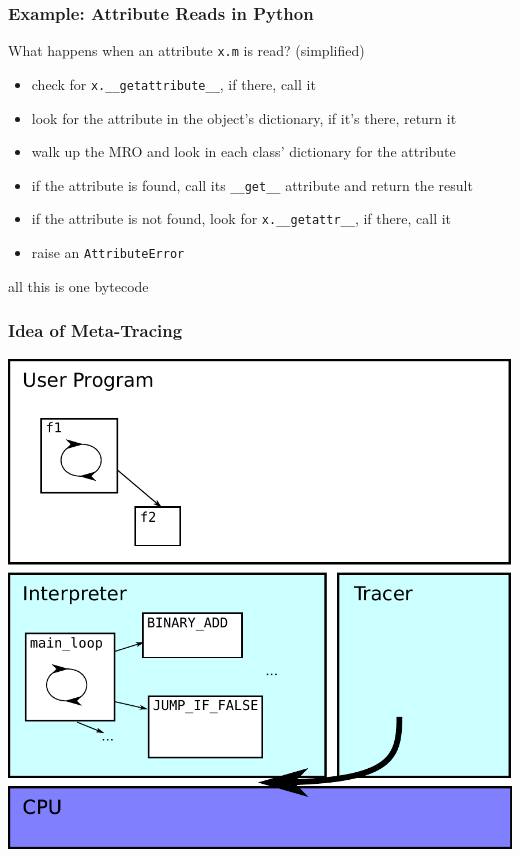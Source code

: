 \documentclass[utf8x]{beamer}
\begin{document}
\begin{frame}
  \frametitle{Example: Attribute Reads in Python}
  What happens when an attribute \texttt{x.m} is read? (simplified)
  \begin{itemize}
      \item check for \texttt{x.\_\_getattribute\_\_}, if there, call it
      \pause
      \item look for the attribute in the object's dictionary, if it's there, return it
      \pause
      \item walk up the MRO and look in each class' dictionary for the attribute
      \pause
      \item if the attribute is found, call its \texttt{\_\_get\_\_} attribute and return the result
      \pause
      \item if the attribute is not found, look for \texttt{x.\_\_getattr\_\_}, if there, call it
      \pause
      \item raise an \texttt{AttributeError}
  \end{itemize}
  \pause
  all this is one bytecode
\end{frame}

\begin{frame}
  \frametitle{Idea of Meta-Tracing}
  \includegraphics[scale=0.5]{figures/trace05.pdf}
\end{frame}
\end{document}
